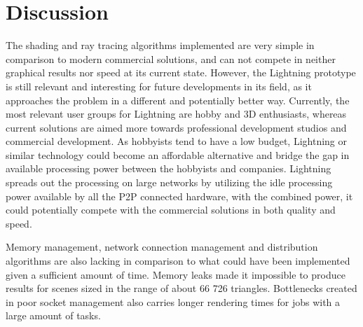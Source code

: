 
\section{Discussion}




The shading and ray tracing algorithms implemented are very simple in
comparison to modern commercial solutions, and can not compete 
in neither graphical results nor speed at its current state. However, the
Lightning prototype is still relevant and interesting for 
future developments in its field, as it approaches the problem in a different
and potentially better way. Currently, the most 
relevant user groups for Lightning are hobby and 3D enthusiasts, whereas
current solutions are aimed more towards professional 
development studios and commercial development. As hobbyists tend to have a
low budget, Lightning or similar technology could become 
an affordable alternative and bridge the gap in available processing power
between the hobbyists and companies. Lightning spreads 
out the processing on large networks by utilizing the idle processing power
available by all the P2P connected hardware, with the 
combined power, it could potentially compete with the commercial solutions
in both quality and speed.

Memory management, network connection management and distribution algorithms are
also lacking in comparison to what could have been implemented given a
sufficient amount of time. Memory leaks made it
impossible to produce results for scenes sized in the range of about 66 726
triangles. Bottlenecks created in poor socket management also carries longer
rendering times for jobs with a large amount of tasks.

